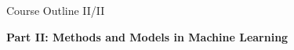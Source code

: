 \documentclass[main.tex]{subfiles}
\begin{document}
    \begin{frame}{Course Outline II/II}
        \begin{minipage}{\textwidth}    
            \textbf{Part II: Methods and Models in Machine Learning}
            \tableofcontents[hideallsubsections, sections={5-9}, part=2] 
        \end{minipage}        
    \end{frame}
\end{document}
